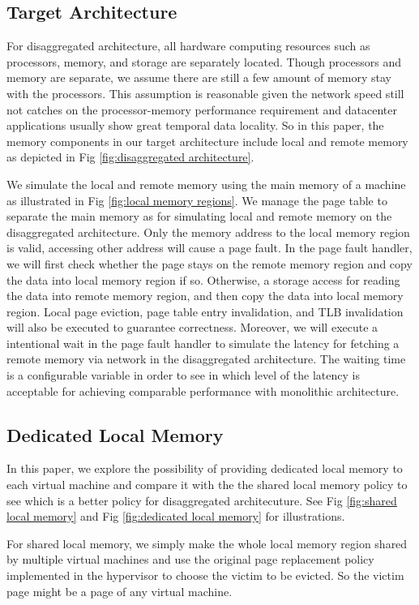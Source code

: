 \documentclass[twocolumn]{article}
\begin{document}
\subsection{Target Architecture}
For disaggregated architecture, all hardware computing resources such as processors, memory, and storage are separately located. Though processors and memory are separate, we assume there are still a few amount of memory stay with the processors. This assumption is reasonable given the network speed still not catches on the processor-memory performance requirement\cite{NetworkRequirement} and datacenter applications usually show great temporal data locality\cite{NNLoad,MapReduceLoad}. So in this paper, the memory components in our target architecture include local and remote memory as depicted in Fig \ref{fig:disaggregated architecture}.

We simulate the local and remote memory using the main memory of a machine as illustrated in Fig \ref{fig:local memory regions}. We manage the page table to separate the main memory as for simulating local and remote memory on the disaggregated architecture. Only the memory address to the local memory region is valid, accessing other address will cause a page fault. In the page fault handler, we will first check whether the page stays on the remote memory region and copy the data into local memory region if so. Otherwise, a storage access for reading the data into remote memory region, and then copy the data into local memory region. Local page eviction, page table entry invalidation, and TLB invalidation will also be executed to guarantee correctness. Moreover, we will execute a intentional wait in the page fault handler to simulate the latency for fetching a remote memory via network in the disaggregated architecture. The waiting time is a configurable variable in order to see in which level of the latency is acceptable for achieving comparable performance with monolithic architecture.

\subsection{Dedicated Local Memory}
In this paper, we explore the possibility of providing dedicated local memory to each virtual machine and compare it with the the shared local memory policy to see which is a better policy for disaggregated architecuture. See Fig \ref{fig:shared local memory} and Fig \ref{fig:dedicated local memory} for illustrations.

For shared local memory, we simply make the whole local memory region shared by multiple virtual machines and use the original page replacement policy implemented in the hypervisor to choose the victim to be evicted. So the victim page might be a page of any virtual machine.
\end{document}
